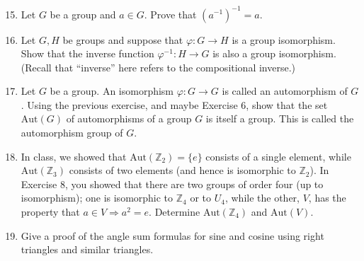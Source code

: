 \documentclass[12pt]{article}
\newcommand{\ZZ}{{\mathbb Z}}
\newcommand{\Aut}{\textrm{Aut}}
\def\demph#1{{\color{Maroon}#1}}
\begin{document}
\begin{enumerate}
\setcounter{enumi}{14}

\item
  Let $G$ be a group and $a\in G$.
  Prove that $(a^{-1})^{-1}=a$.


\item
  Let $G,H$ be groups and suppose that $\varphi\colon G\to H$ is a group isomorphism.
  Show that the inverse function $\varphi^{-1}\colon H\to G$ is also a group isomorphism.
  (Recall that ``inverse'' here refers to the compositional inverse.)
  
  
\item 
  Let $G$ be a group.
  An isomorphism $\varphi\colon G\to G$ is called an \demph{automorphism} of $G$.
  Using the previous exercise, and maybe Exercise 6, show that the set $\Aut(G)$ of automorphisms of a group $G$ is
  itself a group.
  This is called the \demph{automorphism group of $G$}.

\item
  In class, we showed that $\Aut(\ZZ_2)=\{e\}$ consists of a single element, while
  $\Aut(\ZZ_3)$ consists of two elements (and hence is isomorphic to $\ZZ_2$).
  In Exercise 8, you showed that there are two groups of order four (up to isomorphism); one is isomorphic to $\ZZ_4$ or
  to $U_4$, while the other, $V$, has the property that $a\in V\Rightarrow a^2=e$.
  Determine $\Aut(\ZZ_4)$ and $\Aut(V)$.


\item
   Give a proof of the angle sum formulas for sine and cosine using right triangles and similar triangles.


\end{enumerate}
\end{document}
